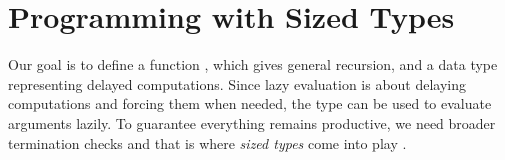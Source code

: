 
\section{Programming with Sized Types}
Our goal is to define a function , which gives general recursion, and a data type  representing delayed computations.
Since lazy evaluation is about delaying computations and forcing them when needed, the type  can be used to evaluate arguments lazily.
To guarantee everything remains productive, we need broader termination checks and that is where \emph{sized types} come into play \cite{abel2004}.

